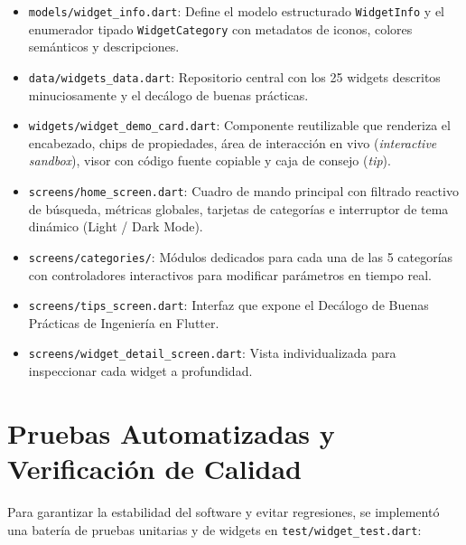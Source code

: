 \documentclass[12pt,a4paper]{article}
\begin{document}
\begin{itemize}[leftmargin=*]
    \item \texttt{models/widget\_info.dart}: Define el modelo estructurado \texttt{WidgetInfo} y el enumerador tipado \texttt{WidgetCategory} con metadatos de iconos, colores semánticos y descripciones.
    \item \texttt{data/widgets\_data.dart}: Repositorio central con los 25 widgets descritos minuciosamente y el decálogo de buenas prácticas.
    \item \texttt{widgets/widget\_demo_card.dart}: Componente reutilizable que renderiza el encabezado, chips de propiedades, área de interacción en vivo (\textit{interactive sandbox}), visor con código fuente copiable y caja de consejo (\textit{tip}).
    \item \texttt{screens/home\_screen.dart}: Cuadro de mando principal con filtrado reactivo de búsqueda, métricas globales, tarjetas de categorías e interruptor de tema dinámico (Light / Dark Mode).
    \item \texttt{screens/categories/}: Módulos dedicados para cada una de las 5 categorías con controladores interactivos para modificar parámetros en tiempo real.
    \item \texttt{screens/tips\_screen.dart}: Interfaz que expone el Decálogo de Buenas Prácticas de Ingeniería en Flutter.
    \item \texttt{screens/widget_detail_screen.dart}: Vista individualizada para inspeccionar cada widget a profundidad.
\end{itemize}

\section{Pruebas Automatizadas y Verificación de Calidad}

Para garantizar la estabilidad del software y evitar regresiones, se implementó una batería de pruebas unitarias y de widgets en \texttt{test/widget\_test.dart}:
\end{document}
